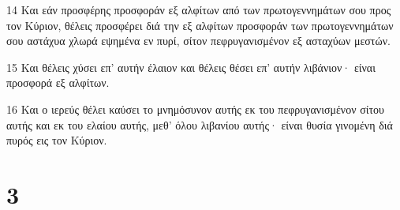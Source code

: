\par 14 Και εάν προσφέρης προσφοράν εξ αλφίτων από των πρωτογεννημάτων σου προς τον Κύριον, θέλεις προσφέρει διά την εξ αλφίτων προσφοράν των πρωτογεννημάτων σου αστάχυα χλωρά εψημένα εν πυρί, σίτον πεφρυγανισμένον εξ ασταχύων μεστών.
\par 15 Και θέλεις χύσει επ' αυτήν έλαιον και θέλεις θέσει επ' αυτήν λιβάνιον· είναι προσφορά εξ αλφίτων.
\par 16 Και ο ιερεύς θέλει καύσει το μνημόσυνον αυτής εκ του πεφρυγανισμένον σίτου αυτής και εκ του ελαίου αυτής, μεθ' όλου λιβανίου αυτής· είναι θυσία γινομένη διά πυρός εις τον Κύριον.

\chapter{3}

